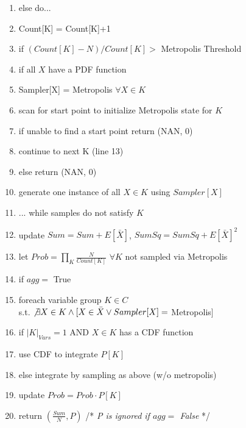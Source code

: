 \begin{figure}
\begin{algorithm}
\begin{enumerate}
\item \hspace*{0.3in} else do...
\item \hspace*{0.4in} Count[K] = Count[K]+1
\item \hspace*{0.4in} if $(Count[K]-N)/Count[K] >$ Metropolis Threshold
\item \hspace*{0.5in} if all $X$ have a PDF function
\item \hspace*{0.6in} Sampler[X] = Metropolis $\forall X \in K$
\item \hspace*{0.6in} scan for start point to initialize Metropolis state for $K$ 
\item \hspace*{0.6in} if unable to find a start point return (NAN, 0)
\item \hspace*{0.6in} continue to next K (line 13)
\item \hspace*{0.5in} else return (NAN, 0)
\item \hspace*{0.4in} generate one instance of all $X \in K$ using $Sampler[X]$
\item \hspace*{0.3in} ... while samples do not satisfy $K$
\item \hspace*{0.2in} update $Sum = Sum + E[\bar X]$, $SumSq = SumSq + E[\bar X]^2$
\item \hspace*{0.1in} let $Prob = \prod_K \frac{N}{Count[K]}$ $\forall K$ not sampled via Metropolis
\item \hspace*{0.1in} if $agg =$ True
\item \hspace*{0.2in} foreach variable group $K \in C$ \\ \hspace*{0.5in}s.t. $\not\exists X \in K \wedge [X \in \bar X \vee Sampler[X] =$ Metropolis$]$ 
\item \hspace*{0.3in} if $|K|_{Vars} = 1$ AND $X\in K$ has a CDF function
\item \hspace*{0.4in} use CDF to integrate $P[K]$
\item \hspace*{0.3in} else integrate by sampling as above (w/o metropolis)
\item \hspace*{0.3in} update $Prob = Prob \cdot P[K]$
\item \hspace*{0.1in} return $(\frac{Sum}{N}, P)$ /* \textit{P is ignored if $agg =$ False} */
\end{enumerate}
\end{algorithm}\vspace*{-0.2in}
\end{figure}

